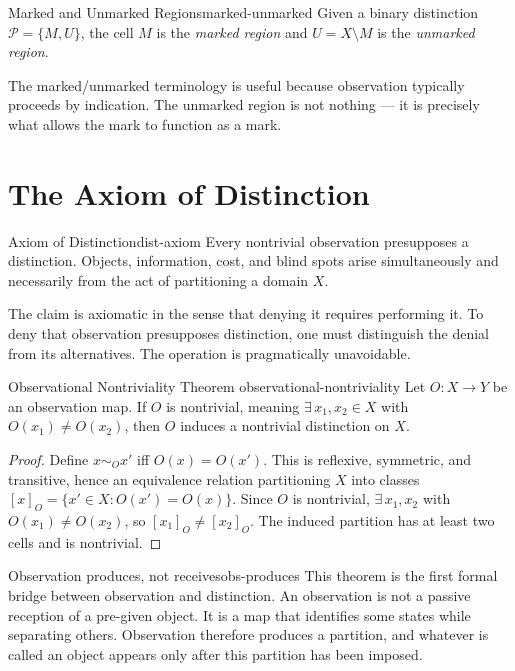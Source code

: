 \documentclass[12pt,twoside,openright]{book}
\newcommand{\partition}{\mathcal{P}}
\begin{document}
\begin{definition}{Marked and Unmarked Regions}{marked-unmarked}
  Given a binary distinction $\partition = \{M, U\}$,
  the cell $M$ is the \emph{marked region} and
  $U = X \setminus M$ is the \emph{unmarked region}.
\end{definition}

The marked/unmarked terminology is useful because
observation typically proceeds by indication. The unmarked
region is not nothing — it is precisely what allows the
mark to function as a mark.

\section{The Axiom of Distinction}
\label{sec:ch1-axiom}

\begin{axiom}{Axiom of Distinction}{dist-axiom}
  Every nontrivial observation presupposes a distinction.
  Objects, information, cost, and blind spots arise
  simultaneously and necessarily from the act of
  partitioning a domain $X$.
\end{axiom}

The claim is axiomatic in the sense that denying it
requires performing it. To deny that observation
presupposes distinction, one must distinguish the denial
from its alternatives. The operation is pragmatically
unavoidable.

\begin{theorem}{Observational Nontriviality Theorem}%
  {observational-nontriviality}
  Let $O: X \to Y$ be an observation map. If $O$ is
  nontrivial, meaning $\exists\, x_1, x_2 \in X$ with
  $O(x_1) \ne O(x_2)$, then $O$ induces a nontrivial
  distinction on $X$.
\end{theorem}

\begin{proof}
  Define $x \sim_O x'$ iff $O(x) = O(x')$. This is
  reflexive, symmetric, and transitive, hence an
  equivalence relation partitioning $X$ into classes
  $[x]_O = \{x' \in X : O(x') = O(x)\}$.
  Since $O$ is nontrivial, $\exists\, x_1, x_2$ with
  $O(x_1) \ne O(x_2)$, so $[x_1]_O \ne [x_2]_O$.
  The induced partition has at least two cells and is
  nontrivial.
\end{proof}

\begin{remark}{Observation produces, not receives}{obs-produces}
  This theorem is the first formal bridge between
  observation and distinction. An observation is not a
  passive reception of a pre-given object. It is a map
  that identifies some states while separating others.
  Observation therefore produces a partition, and whatever
  is called an object appears only after this partition
  has been imposed.
\end{remark}
\end{document}
